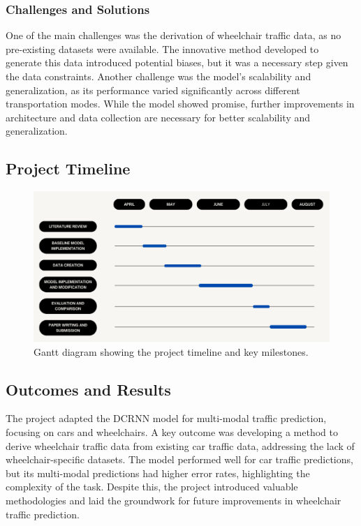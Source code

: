 \subsubsection{Challenges and Solutions}\label{subsubsec:challenges-and-solutions}
One of the main challenges was the derivation of wheelchair traffic data, as no pre-existing datasets were available.
The innovative method developed to generate this data introduced potential biases, but it was a necessary step given the
data constraints.
Another challenge was the model's scalability and generalization, as its performance varied significantly across
different transportation modes.
While the model showed promise, further improvements in architecture and data collection are necessary for better
scalability and generalization.

\subsection{Project Timeline}\label{subsec:project-timeline}
\begin{figure}[htbp]
    \centering
    \includegraphics[width=1\textwidth]{images/gantt}
    \caption{
        Gantt diagram showing the project timeline and key milestones.
    }
    \label{fig:model}
\end{figure}

\subsection{Outcomes and Results}\label{subsec:outcomes-and-results}
The project adapted the DCRNN model for multi-modal traffic prediction, focusing on cars and wheelchairs.
A key outcome was developing a method to derive wheelchair traffic data from existing car traffic data, addressing the
lack of wheelchair-specific datasets.
The model performed well for car traffic predictions, but its multi-modal predictions had higher error rates,
highlighting the complexity of the task.
Despite this, the project introduced valuable methodologies and laid the groundwork for future improvements in
wheelchair traffic prediction.